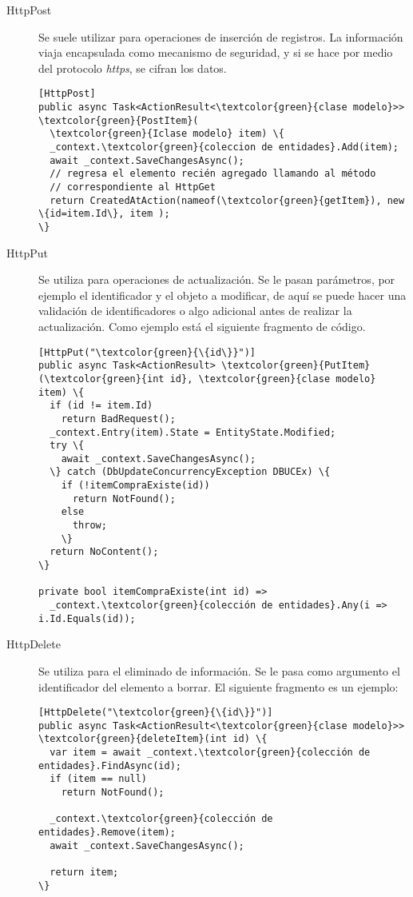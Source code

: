 \documentclass[11pt]{article} %
\begin{document}
\begin{description}
\item[HttpPost] Se suele utilizar para operaciones de inserción de registros. La información viaja encapsulada como mecanismo de seguridad, y si se hace por medio del protocolo \emph{https}, se cifran los datos.
\begin{Verbatim}[commandchars=\\\{\}]
[HttpPost]
public async Task<ActionResult<\textcolor{green}{clase modelo}>> \textcolor{green}{PostItem}(
  \textcolor{green}{Iclase modelo} item) \{
  _context.\textcolor{green}{coleccion de entidades}.Add(item);
  await _context.SaveChangesAsync();
  // regresa el elemento recién agregado llamando al método
  // correspondiente al HttpGet
  return CreatedAtAction(nameof(\textcolor{green}{getItem}), new \{id=item.Id\}, item );
\}
\end{Verbatim}
\item[HttpPut] Se utiliza para operaciones de actualización. Se le pasan parámetros, por ejemplo el identificador y el objeto a modificar, de aquí se puede hacer una validación de identificadores o algo adicional antes de realizar la actualización. Como ejemplo está el siguiente fragmento de código.
\begin{Verbatim}[commandchars=\\\{\}]
[HttpPut("\textcolor{green}{\{id\}}")]
public async Task<ActionResult> \textcolor{green}{PutItem} (\textcolor{green}{int id}, \textcolor{green}{clase modelo} item) \{
  if (id != item.Id)
    return BadRequest();
  _context.Entry(item).State = EntityState.Modified;
  try \{
    await _context.SaveChangesAsync();
  \} catch (DbUpdateConcurrencyException DBUCEx) \{
    if (!itemCompraExiste(id))
      return NotFound();
    else
      throw;
    \}
  return NoContent();
\}

private bool itemCompraExiste(int id) =>
  _context.\textcolor{green}{colección de entidades}.Any(i => i.Id.Equals(id));

\end{Verbatim}
\item[HttpDelete] Se utiliza para el eliminado de información. Se le pasa como argumento el identificador del elemento a borrar. El siguiente fragmento es un ejemplo:
\begin{Verbatim}[commandchars=\\\{\}]
[HttpDelete("\textcolor{green}{\{id\}}")]
public async Task<ActionResult<\textcolor{green}{clase modelo}>> \textcolor{green}{deleteItem}(int id) \{
  var item = await _context.\textcolor{green}{colección de entidades}.FindAsync(id);
  if (item == null)
    return NotFound();

  _context.\textcolor{green}{colección de entidades}.Remove(item);
  await _context.SaveChangesAsync();

  return item;
\} 
\end{Verbatim}
\end{description}
\end{document}
